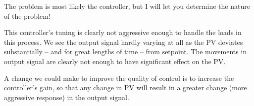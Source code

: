 





The problem is most likely the controller, but I will let you determine the nature of the problem!







This controller's tuning is clearly not aggressive enough to handle the loads in this process.  We see the output signal hardly varying at all as the PV deviates substantially -- and for great lengths of time -- from setpoint.  The movements in output signal are clearly not enough to have significant effect on the PV.

\vskip 10pt

A change we could make to improve the quality of control is to increase the controller's gain, so that any change in PV will result in a greater change (more aggressive response) in the output signal.




